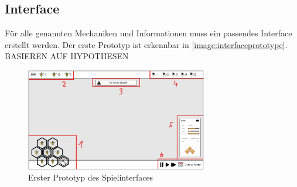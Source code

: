 \subsection{Interface}
Für alle genannten Mechaniken und Informationen muss ein passendes Interface erstellt werden. Der erste Prototyp ist erkennbar in \autoref{image:interfaceprototype}. BASIEREN AUF HYPOTHESEN

\begin{figure}
    \begin{center}
        \includegraphics[width=300px]{0.bilder/interfaceprototype.png}
    \end{center}
    \caption{Erster Prototyp des Spielinterfaces} \label{image:interfaceprototype}
\end{figure}
